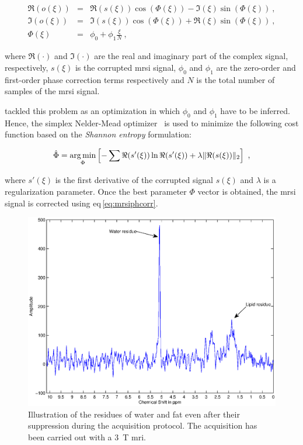 \begin{enumerate}[leftmargin=*]
\begin{eqnarray}
  \Re(o(\xi)) & = & \Re(s(\xi))\cos(\Phi(\xi)) - \Im(\xi)\sin(\Phi(\xi)) \ ,
                    \nonumber  \\
  \Im(o(\xi)) & = & \Im(s(\xi))\cos(\Phi(\xi)) + \Re(\xi)\sin(\Phi(\xi)) \ ,
                    \nonumber \\
  \Phi(\xi) & = & \phi_0 + \phi_1 \frac{\xi}{N} \ , \label{eq:mrsiphcorr}
\end{eqnarray}

\noindent where $\Re(\cdot)$ and $\Im(\cdot)$ are the real and imaginary part
of the complex signal, respectively, $s(\xi)$ is the corrupted \ac{mrsi}
signal, $\phi_0$ and $\phi_1$ are the zero-order and first-order phase
correction terms respectively and $N$ is the total number of samples of the
\ac{mrsi} signal.

\citeauthor{Chen2002} tackled this problem as an optimization in which $\phi_0$
and $\phi_1$ have to be inferred.
Hence, the simplex Nelder-Mead optimizer~\cite{Nelder1965} is used to minimize
the following cost function based on the \textit{Shannon entropy} formulation:

\begin{equation}
  \hat{\Phi} = \operatorname*{arg\,min}_{\Phi} \left[ - \sum \Re(s'(\xi)) \ln \Re(s'(\xi)) +
    \lambda \|\Re(s(\xi))\|_2 \right] \ ,
  \label{eq:phcost}
\end{equation}

\noindent where $s'(\xi)$ is the first derivative of the corrupted signal
$s(\xi)$ and $\lambda$ is a regularization parameter.
Once the best parameter $\Phi$ vector is obtained, the \ac{mrsi} signal is
corrected using \acs{eq}\,\eqref{eq:mrsiphcorr}.

\begin{figure}
  \centering
  \includegraphics[width=0.7\linewidth]{3_review/figures/processing/pre-processing/water/water_fat.eps}
  \caption[Illustration of water and fat residues in \acs*{mrsi} signal after
  suppression during acquisition.]{Illustration of the residues of water and
    fat even after their suppression during the acquisition protocol. The
    acquisition has been carried out with a \SI{3}{\tesla} \acs*{mri}.}
  \label{fig:waterfat}
\end{figure}


\end{enumerate}
